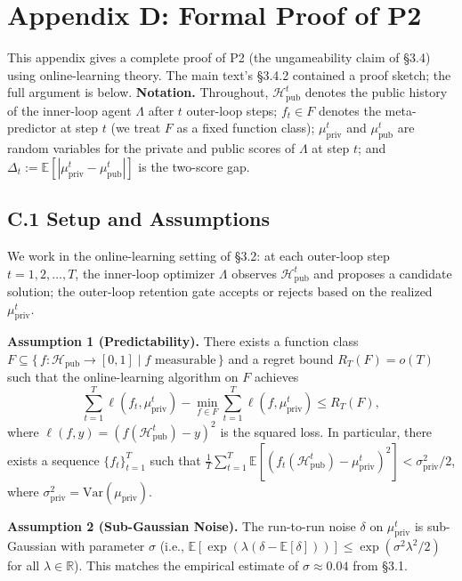 
\section*{Appendix D: Formal Proof of P2}

This appendix gives a complete proof of P2 (the ungameability claim of \S3.4) using online-learning theory. The main text's \S3.4.2 contained a proof sketch; the full argument is below. \textbf{Notation.} Throughout, $\mathcal{H}_{\text{pub}}^t$ denotes the public history of the inner-loop agent $\Lambda$ after $t$ outer-loop steps; $f_t \in F$ denotes the meta-predictor at step $t$ (we treat $F$ as a fixed function class); $\mu_{\text{priv}}^t$ and $\mu_{\text{pub}}^t$ are random variables for the private and public scores of $\Lambda$ at step $t$; and $\Delta_t := \mathbb{E}[|\mu_{\text{priv}}^t - \mu_{\text{pub}}^t|]$ is the two-score gap.

\subsection*{C.1 Setup and Assumptions}

We work in the online-learning setting of \S3.2: at each outer-loop step $t = 1, 2, \ldots, T$, the inner-loop optimizer $\Lambda$ observes $\mathcal{H}_{\text{pub}}^t$ and proposes a candidate solution; the outer-loop retention gate accepts or rejects based on the realized $\mu_{\text{priv}}^t$.

\textbf{Assumption 1 (Predictability).} There exists a function class $F \subseteq \{\,f : \mathcal{H}_{\text{pub}} \to [0,1] \mid f \text{ measurable}\,\}$ and a regret bound $R_T(F) = o(T)$ such that the online-learning algorithm on $F$ achieves
\[
\sum_{t=1}^{T} \ell(f_t, \mu_{\text{priv}}^t) - \min_{f \in F} \sum_{t=1}^{T} \ell(f, \mu_{\text{priv}}^t) \le R_T(F),
\]
where $\ell(f, y) = (f(\mathcal{H}_{\text{pub}}^t) - y)^2$ is the squared loss. In particular, there exists a sequence $\{f_t\}_{t=1}^T$ such that $\frac{1}{T} \sum_{t=1}^{T} \mathbb{E}[(f_t(\mathcal{H}_{\text{pub}}^t) - \mu_{\text{priv}}^t)^2] < \sigma_{\text{priv}}^2 / 2$, where $\sigma_{\text{priv}}^2 = \mathrm{Var}(\mu_{\text{priv}})$.

\textbf{Assumption 2 (Sub-Gaussian Noise).} The run-to-run noise $\delta$ on $\mu_{\text{priv}}^t$ is sub-Gaussian with parameter $\sigma$ (i.e., $\mathbb{E}[\exp(\lambda(\delta - \mathbb{E}[\delta]))] \le \exp(\sigma^2 \lambda^2 / 2)$ for all $\lambda \in \mathbb{R}$). This matches the empirical estimate of $\sigma \approx 0.04$ from \S3.1.

